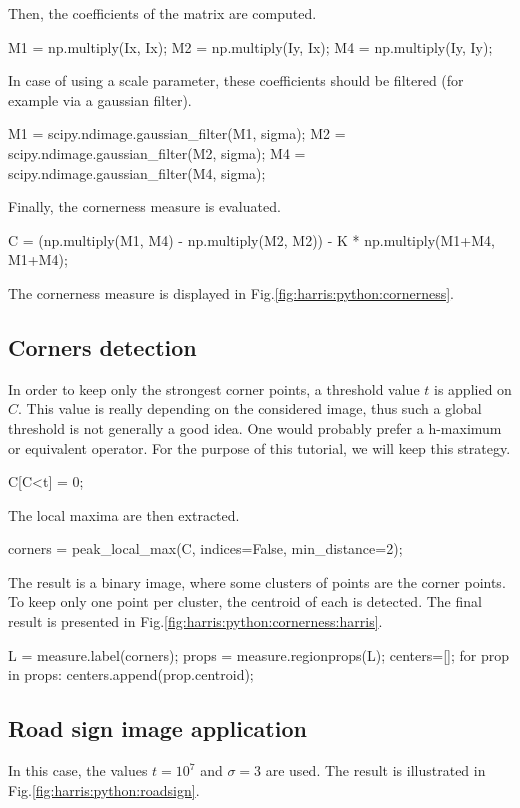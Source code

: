 Then, the coefficients of the matrix are computed.
\begin{python}
M1 = np.multiply(Ix, Ix);
M2 = np.multiply(Iy, Ix);
M4 = np.multiply(Iy, Iy);
\end{python}

In case of using a scale parameter, these coefficients should be filtered (for example via a gaussian filter).
\begin{python}
M1 = scipy.ndimage.gaussian_filter(M1, sigma);
M2 = scipy.ndimage.gaussian_filter(M2, sigma);
M4 = scipy.ndimage.gaussian_filter(M4, sigma);
\end{python}

Finally, the cornerness measure is evaluated.
\begin{python}
C = (np.multiply(M1, M4) - np.multiply(M2, M2)) - K * np.multiply(M1+M4, M1+M4);
\end{python}

The cornerness measure is displayed in Fig.\ref{fig:harris:python:cornerness}.

\subsection{Corners detection}

In order to keep only the strongest corner points, a threshold value $t$ is applied on $C$. This value is really depending on the considered image, thus such a global threshold is not generally a good idea. One would probably prefer a h-maximum or equivalent operator. For the purpose of this tutorial, we will keep this strategy.

\begin{python}
C[C<t] = 0;
\end{python}

The local maxima are then extracted.
\begin{python}
corners = peak_local_max(C, indices=False, min_distance=2);
\end{python}


The result is a binary image, where some clusters of points are the corner points. To keep only one point per cluster, the centroid of each is detected. The final result is presented in Fig.\ref{fig:harris:python:cornerness:harris}.
\begin{python}
L = measure.label(corners);
props = measure.regionprops(L);
centers=[];
for prop in props:
    centers.append(prop.centroid);
\end{python}
 
\subsection{Road sign image application}
In this case, the values $t=10^7$ and $\sigma=3$ are used. The result is illustrated in Fig.\ref{fig:harris:python:roadsign}.

